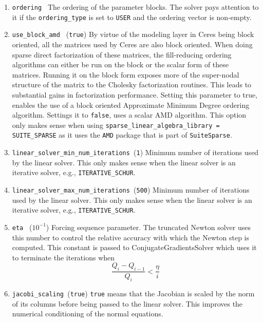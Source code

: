 \begin{enumerate}
\item{\texttt{ordering }} The ordering of the parameter blocks. The
  solver pays attention to it if the \texttt{ordering\_type} is set to
  \texttt{USER} and the ordering vector is non-empty.

\item{\texttt{use\_block\_amd } (\texttt{true})} By virtue of the
  modeling layer in Ceres being block oriented, all the matrices used
  by Ceres are also block oriented.
When doing sparse direct factorization of these matrices, the
fill-reducing ordering algorithms can either be run on the
block or the scalar form of these matrices. Running it on the
block form exposes more of the super-nodal structure of the
matrix to the Cholesky factorization routines. This leads to
substantial gains in factorization performance. Setting this parameter
to true, enables the use of a block oriented Approximate Minimum
Degree ordering algorithm. Settings it to \texttt{false}, uses a
scalar AMD algorithm. This option only makes sense when using
\texttt{sparse\_linear\_algebra\_library = SUITE\_SPARSE} as it uses
the \texttt{AMD} package that is part of \texttt{SuiteSparse}.

\item{\texttt{linear\_solver\_min\_num\_iterations }}(\texttt{1})
  Minimum number of iterations used by the linear solver. This only
  makes sense when the linear solver is an iterative solver, e.g.,
  \texttt{ITERATIVE\_SCHUR}.

\item{\texttt{linear\_solver\_max\_num\_iterations }}(\texttt{500})
  Minimum number of iterations used by the linear solver. This only
  makes sense when the linear solver is an iterative solver, e.g.,
  \texttt{ITERATIVE\_SCHUR}.

\item{\texttt{eta }} ($10^{-1}$)
 Forcing sequence parameter. The truncated Newton solver uses this
 number to control the relative accuracy with which the Newton step is
 computed. This constant is passed to ConjugateGradientsSolver which
 uses it to terminate the iterations when
\begin{equation}
\frac{Q_i - Q_{i-1}}{Q_i} < \frac{\eta}{i}
\end{equation}

\item{\texttt{jacobi\_scaling }}(\texttt{true}) \texttt{true} means
  that the Jacobian is scaled by the norm of its columns before being
  passed to the linear solver. This improves the numerical
  conditioning of the normal equations.


\end{enumerate}

